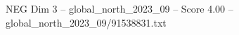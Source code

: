 \begin{textsample}{NEG Dim 3 – global\_north\_2023\_09 – Score 4.00 – global\_north\_2023\_09/91538831.txt}
\end{textsample}

